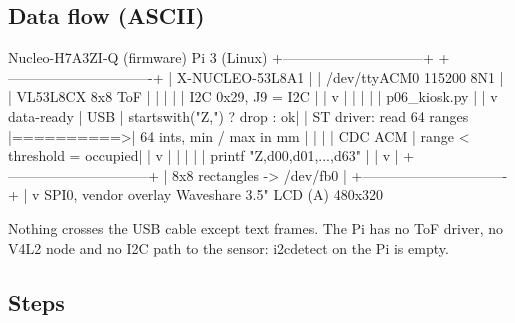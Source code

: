 \subsection*{Data flow (ASCII)}

\begin{asciiart}
  Nucleo-H7A3ZI-Q  (firmware)                Pi 3  (Linux)
  +------------------------------+           +-------------------------------+
  | X-NUCLEO-53L8A1              |           | /dev/ttyACM0  115200 8N1      |
  |   VL53L8CX 8x8 ToF           |           |   |                           |
  |   I2C 0x29, J9 = I2C         |           |   v                           |
  |        |                     |           | p06_kiosk.py                  |
  |        v  data-ready         |    USB    |   startswith("Z,") ? drop : ok|
  | ST driver: read 64 ranges    |==========>|   64 ints, min / max in mm    |
  |        |                     |  CDC ACM  |   range < threshold = occupied|
  |        v                     |           |   |                           |
  | printf "Z,d00,d01,...,d63"   |           |   v                           |
  +------------------------------+           | 8x8 rectangles -> /dev/fb0    |
                                             +-------------------------------+
                                                         |
                                                         v  SPI0, vendor overlay
                                             Waveshare 3.5" LCD (A) 480x320

  Nothing crosses the USB cable except text frames. The Pi has no ToF driver,
  no V4L2 node and no I2C path to the sensor: i2cdetect on the Pi is empty.
\end{asciiart}

\subsection*{Steps}

